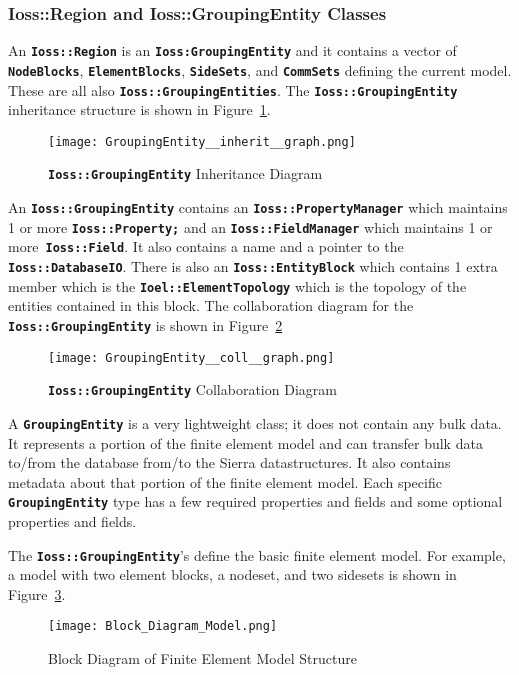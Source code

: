 \documentclass[11pt,twoside]{article}
\newcommand{\code}[1]
   {\mbox{\bf\tt #1}\null}
\begin{document}
\subsubsection{Ioss::Region and Ioss::GroupingEntity Classes}
An \code{Ioss::Region} is an
\code{Ioss:GroupingEntity} and it contains a vector of
\code{NodeBlocks}, \code{ElementBlocks},
\code{SideSets}, and \code{CommSets} defining the current model. These are all
also \code{Ioss::GroupingEntities}. The
\code{Ioss::GroupingEntity} inheritance structure is shown in Figure~\ref{fig:ge_inherit}.
\begin{figure}[htp]
\centering
\texttt{[image: GroupingEntity\_\_inherit\_\_graph.png]}
\caption{\code{Ioss::GroupingEntity} Inheritance Diagram}\label{fig:ge_inherit}
\end{figure}
An \code{Ioss::GroupingEntity}
contains an \code{Ioss::PropertyManager} which maintains 1 or
more \code{Ioss::Property;} and an
\code{Ioss::FieldManager} which maintains 1 or
more\code{ Ioss::Field}. It also contains a name and a
pointer to the \code{Ioss::DatabaseIO}. There is also an
\code{Ioss::EntityBlock} which contains 1 extra member which
is the \code{Ioel::ElementTopology} which is the topology of
the entities contained in this block. The collaboration diagram for
the \code{Ioss::GroupingEntity} is shown in Figure~\ref{fig:ge_collab}
\begin{figure}[htp]
\centering
\texttt{[image: GroupingEntity\_\_coll\_\_graph.png]}
\caption{\code{Ioss::GroupingEntity} Collaboration Diagram}\label{fig:ge_collab}
\end{figure}

A \code{GroupingEntity} is a very lightweight class; it does
not contain any bulk data. It represents a portion of the finite
element model and can transfer bulk data to/from the database from/to
the Sierra datastructures. It also contains metadata about that portion
of the finite element model. Each specific
\code{GroupingEntity} type has a few required properties and
fields and some optional properties and fields. 

The \code{Ioss::GroupingEntity}'s define the basic finite
element model. For example, a model with two element blocks, a nodeset,
and two sidesets is shown in Figure~\ref{fig:block}.
\begin{figure}[htp]
\centering
\texttt{[image: Block\_Diagram\_Model.png]}
\caption{Block Diagram of Finite Element Model Structure}\label{fig:block}
\end{figure}
\end{document}
